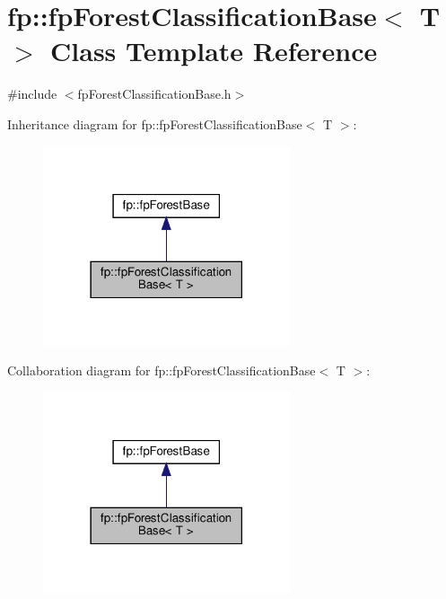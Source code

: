 \hypertarget{classfp_1_1fpForestClassificationBase}{}\section{fp\+:\+:fp\+Forest\+Classification\+Base$<$ T $>$ Class Template Reference}
\label{classfp_1_1fpForestClassificationBase}


{\ttfamily \#include $<$fp\+Forest\+Classification\+Base.\+h$>$}



Inheritance diagram for fp\+:\+:fp\+Forest\+Classification\+Base$<$ T $>$\+:\nopagebreak
\begin{figure}[H]
\begin{center}
\leavevmode
\includegraphics[width=206pt]{classfp_1_1fpForestClassificationBase__inherit__graph}
\end{center}
\end{figure}


Collaboration diagram for fp\+:\+:fp\+Forest\+Classification\+Base$<$ T $>$\+:\nopagebreak
\begin{figure}[H]
\begin{center}
\leavevmode
\includegraphics[width=206pt]{classfp_1_1fpForestClassificationBase__coll__graph}
\end{center}
\end{figure}
